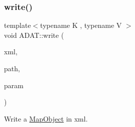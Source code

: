 \subsubsection{\texorpdfstring{write()}{write()}}
{\footnotesize\ttfamily template$<$typename K , typename V $>$ \\
void A\+D\+A\+T\+::write (\begin{DoxyParamCaption}\item[{\mbox{\hyperlink{classADATXML_1_1XMLWriter}{A\+D\+A\+T\+X\+M\+L\+::\+X\+M\+L\+Writer}} \&}]{xml,  }\item[{const std\+::string \&}]{path,  }\item[{const \mbox{\hyperlink{classADAT_1_1MapObject}{Map\+Object}}$<$ K, V $>$ \&}]{param }\end{DoxyParamCaption})\hspace{0.3cm}{\ttfamily [inline]}}



Write a \mbox{\hyperlink{classADAT_1_1MapObject}{Map\+Object}} in xml. 

